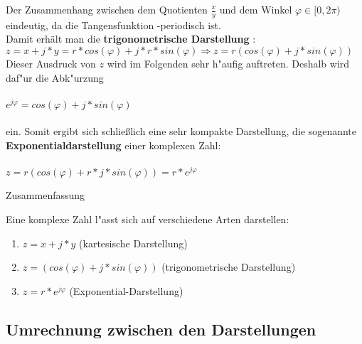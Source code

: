 Der Zusammenhang zwischen dem Quotienten $\frac{x}{y}$ und dem Winkel $\varphi \in [0,2\pi)$ eindeutig, da die Tangensfunktion -periodisch ist.\\
Damit erhält man die \textbf{trigonometrische Darstellung} :\\

$z=x+j*y =r*cos(\varphi)+j*r*sin(\varphi) \Rightarrow z=r(cos(\varphi)+j*sin(\varphi))$\\

Dieser Ausdruck von $z$ wird im Folgenden sehr h"aufig auftreten. Deshalb wird daf"ur die Abk"urzung\\
\\
$e^{j\varphi} =cos(\varphi)+j*sin(\varphi)$\\
\\
ein.
Somit ergibt sich schließlich eine sehr kompakte Darstellung, die sogenannte \textbf{Exponentialdarstellung} einer komplexen Zahl:\\\\
$z=  {r(cos(\varphi)+r*j*sin(\varphi))}=r*e^{j\varphi}$

\begin{Bemerkung}
Zusammenfassung\\
\end{Bemerkung}

Eine komplexe Zahl l"asst sich auf verschiedene Arten darstellen:\\


\begin{tcolorbox}

\begin{enumerate}

\item $z=x+j*y$ (kartesische Darstellung)
\item $z=(cos(\varphi)+j*sin(\varphi))$ (trigonometrische Darstellung)
\item $z=r*e^{j\varphi}$ (Exponential-Darstellung)\\

\end{enumerate}

\end{tcolorbox}

	\subsection{Umrechnung zwischen den Darstellungen}
